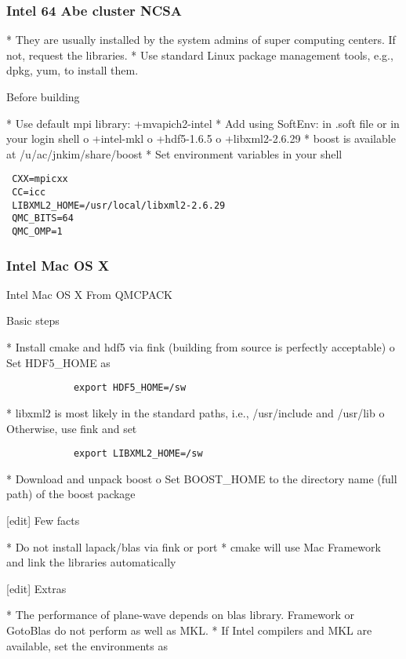 \subsubsection{Intel 64 Abe cluster \@ NCSA}
    *  They are usually installed by the system admins of super computing centers. If not, request the libraries.
    * Use standard Linux package management tools, e.g., dpkg, yum, to install them. 

Before building

    * Use default mpi library: +mvapich2-intel
    * Add using SoftEnv: in .soft file or in your login shell
          o +intel-mkl
          o +hdf5-1.6.5
          o +libxml2-2.6.29 
    * boost is available at /u/ac/jnkim/share/boost
    * Set environment variables in your shell 
\begin{verbatim}
 CXX=mpicxx
 CC=icc
 LIBXML2_HOME=/usr/local/libxml2-2.6.29
 QMC_BITS=64
 QMC_OMP=1
\end{verbatim}

\subsubsection{Intel Mac OS X}
Intel Mac OS X
From QMCPACK

Basic steps

    * Install cmake and hdf5 via fink (building from source is perfectly acceptable)
          o Set HDF5\_HOME as

\begin{verbatim}
            export HDF5_HOME=/sw
\end{verbatim}

    * libxml2 is most likely in the standard paths, i.e., /usr/include and /usr/lib
          o Otherwise, use fink and set

\begin{verbatim}
            export LIBXML2_HOME=/sw
\end{verbatim}

    * Download and unpack boost
          o Set BOOST\_HOME to the directory name (full path) of the boost package 

[edit] Few facts

    * Do not install lapack/blas via fink or port
    * cmake will use Mac Framework and link the libraries automatically 

[edit] Extras

    * The performance of plane-wave depends on blas library. Framework or GotoBlas do not perform as well as MKL.
    * If Intel compilers and MKL are available, set the environments as 

